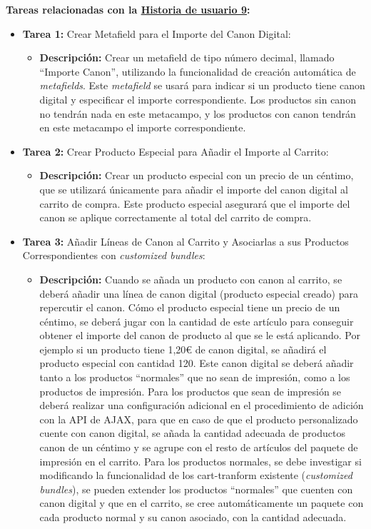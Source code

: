 \documentclass[11pt]{article}
\begin{document}
\textbf{Tareas relacionadas con la \hyperref[sec:historia9]{Historia de usuario 9}:}
\begin{itemize}
    \item \textbf{Tarea 1:} Crear Metafield para el Importe del Canon Digital:
          \begin{itemize}[label=--]
              \item \textbf{Descripción:} Crear un metafield de tipo número decimal, llamado ``Importe Canon'', utilizando la funcionalidad de creación automática de \textit{metafields}. Este \textit{metafield} se usará para indicar si un producto tiene canon digital y especificar el importe correspondiente. Los productos sin canon no tendrán nada en este metacampo, y los productos con canon tendrán en este metacampo el importe correspondiente.
          \end{itemize}
    \item \textbf{Tarea 2:} Crear Producto Especial para Añadir el Importe al Carrito:
          \begin{itemize}[label=--]
              \item \textbf{Descripción:} Crear un producto especial con un precio de un céntimo, que se utilizará únicamente para añadir el importe del canon digital al carrito de compra. Este producto especial asegurará que el importe del canon se aplique correctamente al total del carrito de compra.
          \end{itemize}
    \item \textbf{Tarea 3:} Añadir Líneas de Canon al Carrito y Asociarlas a sus Productos Correspondientes con \textit{customized bundles}:
          \begin{itemize}[label=--]
              \item \textbf{Descripción:} Cuando se añada un producto con canon al carrito, se deberá añadir una línea de canon digital (producto especial creado) para repercutir el canon.
              Cómo el producto especial tiene un precio de un céntimo, se deberá jugar con la cantidad de este artículo para conseguir obtener el importe del canon de producto al que se le está aplicando. Por ejemplo
              si un producto tiene 1,20€ de canon digital, se añadirá el producto especial con cantidad 120.
              Este canon digital se deberá añadir tanto a los productos ``normales'' que no sean de impresión, como a los productos de impresión.
              Para los productos que sean de impresión se deberá realizar una configuración adicional en el procedimiento de adición con la API de AJAX, para que en caso de que el producto personalizado cuente con canon digital, se añada la cantidad adecuada de productos canon de un céntimo y se agrupe con el resto de artículos del paquete de impresión en el carrito.
              Para los productos normales, se debe investigar si modificando la funcionalidad de los cart-tranform existente (\textit{customized bundles}), se pueden extender los productos ``normales'' que cuenten con canon digital y que en el carrito, se cree automáticamente un paquete con cada producto normal y su canon asociado, con la cantidad adecuada.
          \end{itemize}
\end{itemize}
\end{document}
